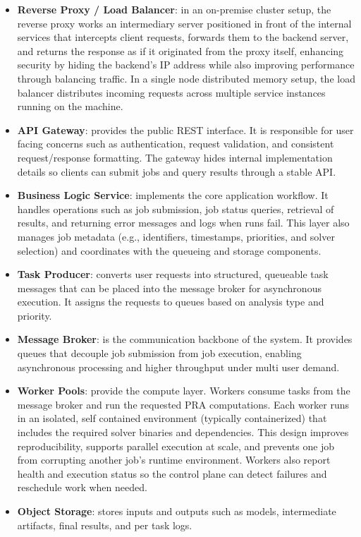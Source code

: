 \begin{itemize}
    \item \textbf{Reverse Proxy / Load Balancer}: in an on-premise cluster setup, the reverse proxy works an intermediary server positioned in front of the internal services that intercepts client requests, forwards them to the backend server, and returns the response as if it originated from the proxy itself, enhancing security by hiding the backend's IP address while also improving performance through balancing traffic. In a single node distributed memory setup, the load balancer distributes incoming requests across multiple service instances running on the machine.
    \item \textbf{API Gateway}: provides the public REST interface. It is responsible for user facing concerns such as authentication, request validation, and consistent request/response formatting. The gateway hides internal implementation details so clients can submit jobs and query results through a stable API.
    \item \textbf{Business Logic Service}: implements the core application workflow. It handles operations such as job submission, job status queries, retrieval of results, and returning error messages and logs when runs fail. This layer also manages job metadata (e.g., identifiers, timestamps, priorities, and solver selection) and coordinates with the queueing and storage components.
    \item \textbf{Task Producer}: converts user requests into structured, queueable task messages that can be placed into the message broker for asynchronous execution. It assigns the requests to queues based on analysis type and priority.
    \item \textbf{Message Broker}: is the communication backbone of the system. It provides queues that decouple job submission from job execution, enabling asynchronous processing and higher throughput under multi user demand.
    
    
    \item \textbf{Worker Pools}: provide the compute layer. Workers consume tasks from the message broker and run the requested PRA computations. Each worker runs in an isolated, self contained environment (typically containerized) that includes the required solver binaries and dependencies. This design improves reproducibility, supports parallel execution at scale, and prevents one job from corrupting another job's runtime environment. Workers also report health and execution status so the control plane can detect failures and reschedule work when needed.
    \item \textbf{Object Storage}: stores inputs and outputs such as models, intermediate artifacts, final results, and per task logs.
\end{itemize}


